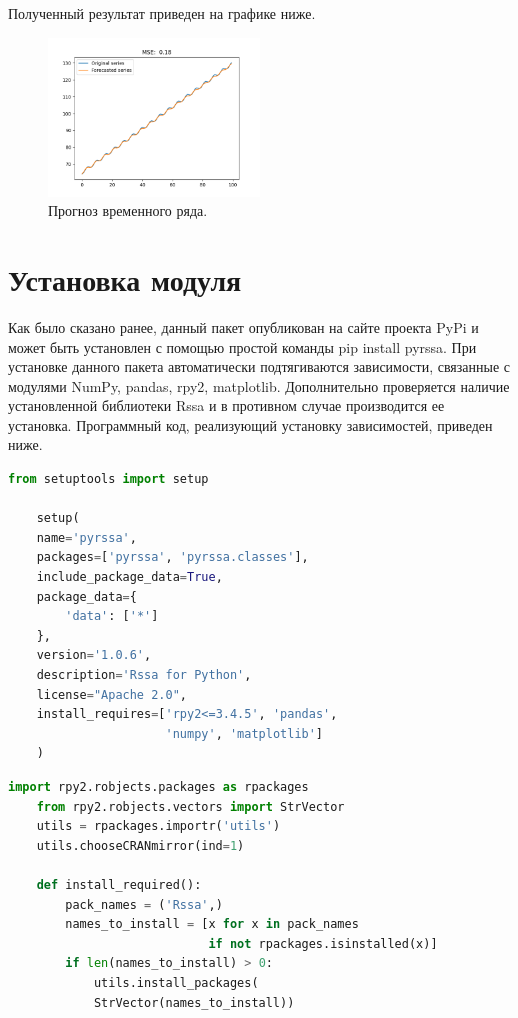 \documentclass[specialist,
			   substylefile = spbu_report.rtx,
			   subf,href,colorlinks=true, 12pt]{disser}
\begin{document}
Полученный результат приведен на графике ниже.

\begin{figure}[H]
	\centering
	\includegraphics[width=0.5\textwidth]{mpy_for}
	\caption{Прогноз временного ряда.}
	\label{fig:mpy_for}
\end{figure}

\section{Установка модуля}

Как было сказано ранее, данный пакет опубликован на сайте проекта PyPi \cite{pyrssa-lib} и может быть установлен с помощью простой команды pip install pyrssa. При установке данного пакета автоматически подтягиваются зависимости, связанные с модулями NumPy, pandas, rpy2, matplotlib. Дополнительно проверяется наличие установленной библиотеки Rssa и в противном случае производится ее установка. Программный код, реализующий установку зависимостей, приведен ниже.

\begin{lstlisting}[language=Python, caption=Настройки проекта для публикации пакета на сайте PyPi.]
	from setuptools import setup
	
	setup(
	name='pyrssa',
	packages=['pyrssa', 'pyrssa.classes'],
	include_package_data=True,
	package_data={
		'data': ['*']
	},
	version='1.0.6',
	description='Rssa for Python',
	license="Apache 2.0",
	install_requires=['rpy2<=3.4.5', 'pandas', 
	                  'numpy', 'matplotlib']
	)
\end{lstlisting}

\begin{lstlisting}[language=Python, caption=Содержимое файла для инсталляции модуля Rssa.]
	import rpy2.robjects.packages as rpackages
	from rpy2.robjects.vectors import StrVector
	utils = rpackages.importr('utils')
	utils.chooseCRANmirror(ind=1)
	
	def install_required():
		pack_names = ('Rssa',)
		names_to_install = [x for x in pack_names 
		                    if not rpackages.isinstalled(x)]
		if len(names_to_install) > 0:
			utils.install_packages(
			StrVector(names_to_install))
\end{lstlisting}
\end{document}
